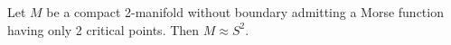Let $M$ be a compact 2-manifold without boundary admitting a Morse function having only 2 critical points. Then $M \approx S^2$.
